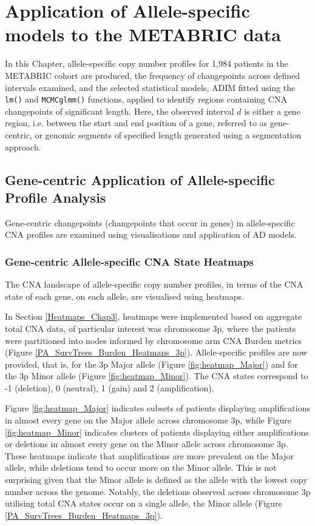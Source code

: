 \section{Application of Allele-specific models to the METABRIC data}
In this Chapter, allele-specific copy number profiles for 1,984 patients in the METABRIC cohort are produced, the frequency of changepoints across defined intervals examined, and the selected statistical models, ADIM fitted using the \texttt{lm()} and \texttt{MCMCglmm()} functions, applied to identify regions containing CNA changepoints of significant length. Here, the observed interval $d$ is either a gene region, i.e. between the start and end position of a gene, referred to as gene-centric, or genomic segments of specified length generated using a segmentation approach.  

\subsection{Gene-centric Application of Allele-specific Profile Analysis}
Gene-centric changepoints (changepoints that occur in genes) in allele-specific CNA profiles are examined using visualisations and application of AD models.

\subsubsection{Gene-centric Allele-specific CNA State Heatmaps}
The CNA landscape of allele-specific copy number profiles, in terms of the CNA state of each gene, on each allele, are visualised using heatmaps.

In Section \ref{Heatmaps_Chap3}, heatmaps were implemented based on aggregate total CNA data, of particular interest was chromosome 3p, where the patients were partitioned into nodes informed by chromosome arm CNA Burden metrics (Figure \ref{PA_SurvTrees_Burden_Heatmaps_3p}). Allele-specific profiles are now provided, that is, for the 3p Major allele (Figure \ref{fig:heatmap_Major}) and for the 3p Minor allele (Figure \ref{fig:heatmap_Minor}). The CNA states correspond to -1 (deletion), 0 (neutral), 1 (gain) and 2 (amplification).

Figure \ref{fig:heatmap_Major} indicates subsets of patients displaying amplifications in almost every gene on the Major allele across chromosome 3p, while Figure \ref{fig:heatmap_Minor} indicates clusters of patients displaying either amplifications or deletions in almost every gene on the Minor allele across chromosome 3p. These heatmaps indicate that amplifications are more prevalent on the Major allele, while deletions tend to occur more on the Minor allele. This is not surprising given that the Minor allele is defined as the allele with the lowest copy number across the genome. Notably, the deletions observed across chromosome 3p utilising total CNA states occur on a single allele, the Minor allele (Figure \ref{PA_SurvTrees_Burden_Heatmaps_3p}). 


